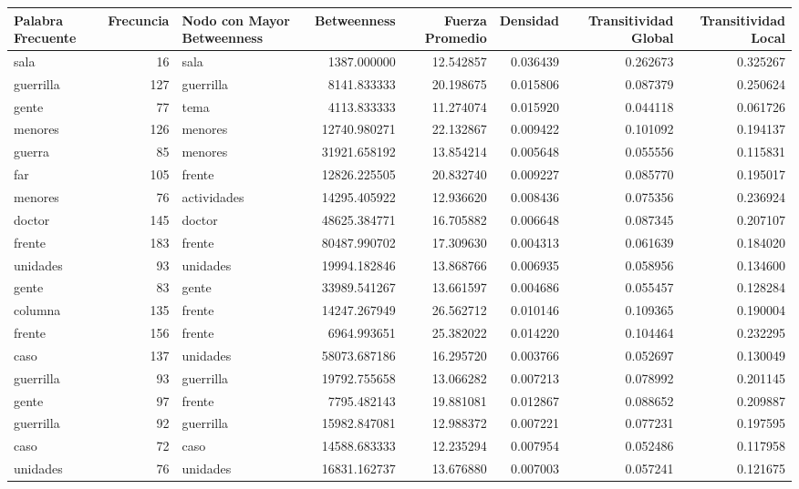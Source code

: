 \begin{tabular}{lrlrrrrr}
\toprule
Palabra Frecuente & Frecuncia & Nodo con Mayor Betweenness & Betweenness & Fuerza Promedio & Densidad & Transitividad Global & Transitividad Local \\
\midrule
sala & 16 & sala & 1387.000000 & 12.542857 & 0.036439 & 0.262673 & 0.325267 \\
guerrilla & 127 & guerrilla & 8141.833333 & 20.198675 & 0.015806 & 0.087379 & 0.250624 \\
gente & 77 & tema & 4113.833333 & 11.274074 & 0.015920 & 0.044118 & 0.061726 \\
menores & 126 & menores & 12740.980271 & 22.132867 & 0.009422 & 0.101092 & 0.194137 \\
guerra & 85 & menores & 31921.658192 & 13.854214 & 0.005648 & 0.055556 & 0.115831 \\
far & 105 & frente & 12826.225505 & 20.832740 & 0.009227 & 0.085770 & 0.195017 \\
menores & 76 & actividades & 14295.405922 & 12.936620 & 0.008436 & 0.075356 & 0.236924 \\
doctor & 145 & doctor & 48625.384771 & 16.705882 & 0.006648 & 0.087345 & 0.207107 \\
frente & 183 & frente & 80487.990702 & 17.309630 & 0.004313 & 0.061639 & 0.184020 \\
unidades & 93 & unidades & 19994.182846 & 13.868766 & 0.006935 & 0.058956 & 0.134600 \\
gente & 83 & gente & 33989.541267 & 13.661597 & 0.004686 & 0.055457 & 0.128284 \\
columna & 135 & frente & 14247.267949 & 26.562712 & 0.010146 & 0.109365 & 0.190004 \\
frente & 156 & frente & 6964.993651 & 25.382022 & 0.014220 & 0.104464 & 0.232295 \\
caso & 137 & unidades & 58073.687186 & 16.295720 & 0.003766 & 0.052697 & 0.130049 \\
guerrilla & 93 & guerrilla & 19792.755658 & 13.066282 & 0.007213 & 0.078992 & 0.201145 \\
gente & 97 & frente & 7795.482143 & 19.881081 & 0.012867 & 0.088652 & 0.209887 \\
guerrilla & 92 & guerrilla & 15982.847081 & 12.988372 & 0.007221 & 0.077231 & 0.197595 \\
caso & 72 & caso & 14588.683333 & 12.235294 & 0.007954 & 0.052486 & 0.117958 \\
unidades & 76 & unidades & 16831.162737 & 13.676880 & 0.007003 & 0.057241 & 0.121675 \\

\end{tabular}
